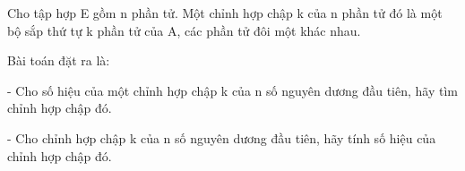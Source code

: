 Cho tập hợp E gồm n phần tử. Một chỉnh hợp chập k  của n phần tử đó là một bộ sắp thứ tự k phần tử của A, các phần tử đôi một khác nhau.  

   Bài toán đặt ra là:  

   - Cho số hiệu của một chỉnh hợp chập k của n số nguyên dương đầu tiên, hãy tìm chỉnh hợp chập đó.  

   - Cho chỉnh hợp chập k của n số nguyên dương đầu tiên, hãy tính số hiệu của chỉnh hợp chập đó.  

\